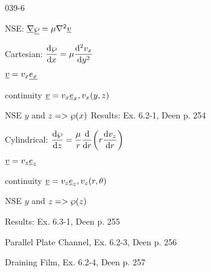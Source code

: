 \begin{mitframe}{039-6}

            
\begin{listone}

\item NSE: $\gradop\uline{\dynpress}=\chempot\nabla^2\uline{\vvel}$
		
\item Cartesian: $\dfrac{\mathrm{d}\dynpress}{\mathrm{d}\disp}=\chempot\dfrac{\mathrm{d}^2\vvel_{\disp}}{\mathrm{d}y^2}$

				\begin{listtwo}
                
                \item $\uline{\vvel}=\vvel_{\disp}\uline{\e_{\disp}}$
                
                \item continuity $\uline{\vvel}=\vvel_{\disp}\mcef_{\disp}, \vvel_{\disp}(y,z)$
                
                \item NSE $y$ and $z=>\dynpress(\disp)$
                Results: Ex. 6.2-1, Deen p. 254
                
                \end{listtwo}
                
\item Cylindrical: $\dfrac{\mathrm{d}\dynpress}{\mathrm{d}z}=\dfrac{\chempot}{\pos}\dfrac{\mathrm{d}}{\mathrm{d}\pos}\bigg(\pos\dfrac{\mathrm{d}\vvel_z}{\mathrm{d}\pos}\bigg)$

				\begin{listtwo}
                
                \item $\uline{\vvel}=\vvel_z\uline\e_z$
                
                \item continuity $\uline{\vvel}=\vvel_z\uline\e_z, \vvel_z(\pos,\theta)$
                
                \item NSE $y$ and $z=>\dynpress(z)$
                
                \item Results: Ex. 6.3-1, Deen p. 255
                
                \end{listtwo}

\item Parallel Plate Channel, Ex. 6.2-3, Deen p. 256
\item Draining Film, Ex. 6.2-4, Deen p. 257
\end{listone}
\end{mitframe}